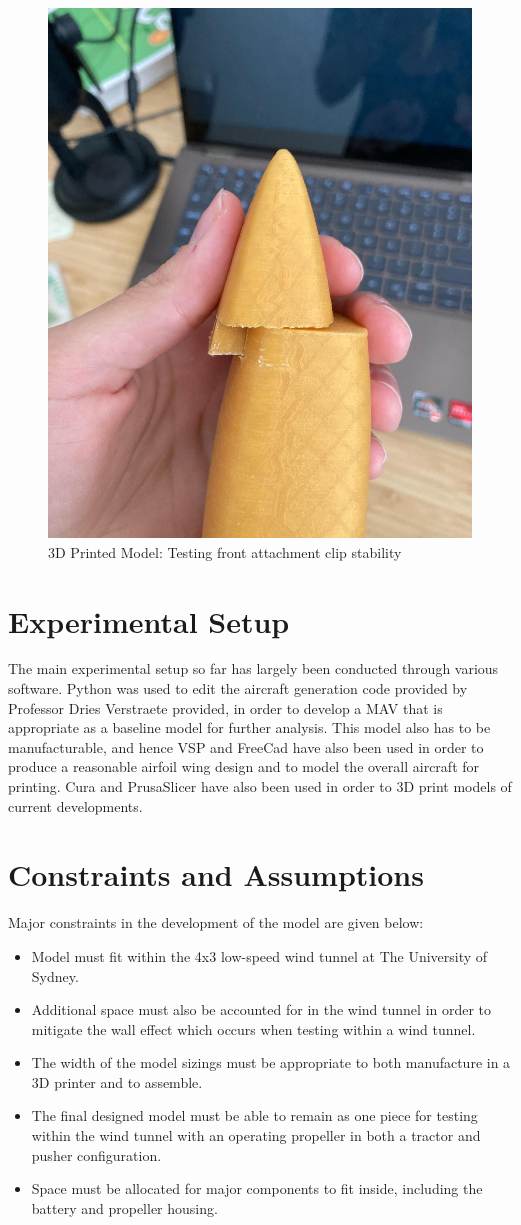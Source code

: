 \begin{figure}[H]
    \centering
    \includegraphics[width=0.5\linewidth]{04_Progress/Figs/clip.jpg}
    \caption{3D Printed Model: Testing front attachment clip stability}
    \label{fig:3Dmodel}
\end{figure}

\section{Experimental Setup}
\label{sec:Experimental Setup}
The main experimental setup so far has largely been conducted through various software. Python was used to edit the aircraft generation code provided by Professor Dries Verstraete provided, in order to develop a \acrshort{MAV} that is appropriate as a baseline model for further analysis. This model also has to be manufacturable, and hence \acrshort{VSP} and FreeCad have also been used in order to produce a reasonable airfoil wing design and to model the overall aircraft for printing. Cura and PrusaSlicer have also been used in order to 3D print models of current developments. 


\section{Constraints and Assumptions}
\label{sec: Constraints and assumptions}
Major constraints in the development of the model are given below: 

\begin{itemize}
    \item Model must fit within the 4x3 low-speed wind tunnel at The University of Sydney.
    \item Additional space must also be accounted for in the wind tunnel in order to mitigate the wall effect which occurs when testing within a wind tunnel.
    \item The width of the model sizings must be appropriate to both manufacture in a 3D printer and to assemble.
    \item The final designed model must be able to remain as one piece for testing within the wind tunnel with an operating propeller in both a tractor and pusher configuration.
    \item Space must be allocated for major components to fit inside, including the battery and propeller housing.
\end{itemize}

